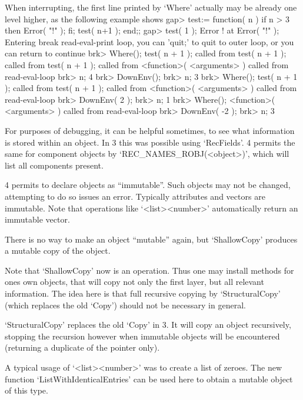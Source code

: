 When interrupting, the first line printed by `Where' actually may be already
one level higher, as the following example shows
\begintt
gap> test:= function( n ) if n > 3 then Error( "!" ); fi; test( n+1 ); end;;
gap> test( 1 );
Error ! at
Error( "!" );
Entering break read-eval-print loop,
you can 'quit;' to quit to outer loop,
or you can return to continue
brk> Where();
test( n + 1 ); called from
test( n + 1 ); called from
test( n + 1 ); called from
<function>( <arguments> ) called from read-eval-loop
brk> n;
4
brk> DownEnv();
brk> n;
3
brk> Where();
test( n + 1 ); called from
test( n + 1 ); called from
<function>( <arguments> ) called from read-eval-loop
brk> DownEnv( 2 );
brk> n;
1
brk> Where();
<function>( <arguments> ) called from read-eval-loop
brk> DownEnv( -2 );
brk> n;
3
\endtt

For purposes of debugging, it can be helpful sometimes, to see what
information is stored within an object. In {\GAP}3 this was possible using
`RecFields'. {\GAP}4 permits the same for component objects by
`REC_NAMES_ROBJ(<object>)', which will list all components present.


{\GAP}4 permits to declare objects as ``immutable''. Such objects may not
be changed, attempting to do so issues an error. Typically attributes and
vectors are immutable. Note that operations like `<list>\*<number>'
automatically return an immutable vector.

There is no way to make an object ``mutable'' again, but `ShallowCopy'
produces a mutable copy of the object.

Note that `ShallowCopy' now is an operation. Thus one may install methods
for ones own objects,
that will copy not only the first layer, but all relevant information.
The idea here is that full recursive copying by `StructuralCopy' (which
replaces the old `Copy') should not be necessary in general.

`StructuralCopy' replaces the old `Copy' in {\GAP}3. It will copy an object
recursively, stopping the recursion however when immutable objects will be
encountered (returning a duplicate of the pointer only).

A typical usage of `<list>\*<number>' was to create a list of zeroes. The
new function `ListWithIdenticalEntries' can be used here to obtain a mutable
object of this type.


